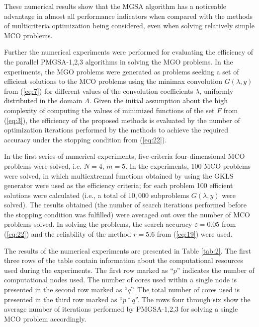\documentclass[review]{elsarticle}
\begin{document}
These numerical results show that the MGSA algorithm has a noticeable advantage in almost all performance indicators when compared with the methods of multicriteria optimization being considered, even when solving relatively simple MCO problems.

Further the numerical experiments were performed for evaluating the efficiency of the parallel PMGSA-1,2,3 algorithms in solving the MGO problems. In the experiments, the MGO problems were generated as problems seeking a set of efficient solutions to the MCO problems using the minimax convolution $G (\lambda, y)$ from (\ref{eq:7}) for different values of the convolution coefficients $\lambda$, uniformly distributed in the domain $\Lambda$. Given the initial assumption about the high complexity of computing the values of minimized functions of the set $F$ from (\ref{eq:3}), the efficiency of the proposed methods is evaluated by the number of optimization iterations performed by the methods to achieve the required accuracy under the stopping condition from (\ref{eq:22}).

In the first series of numerical experiments, five-criteria four-dimensional MCO problems were solved, i.e. $N = 4$, $m = 5$. In the experiments, 100 MCO problems were solved, in which multiextremal functions obtained by using the GKLS generator \cite{c39} were used as the efficiency criteria; for each problem 100 efficient solutions were calculated (i.e., a total of $10,000$ subproblems $G (\lambda, y)$ were solved). The results obtained (the number of search iterations performed before the stopping condition was fulfilled) were averaged out over the number of MCO problems solved. In solving the problems, the search accuracy $\varepsilon = 0.05$ from (\ref{eq:22}) and the reliability of the method $r = 5.6$ from (\ref{eq:19}) were used.
 
The results of the numerical experiments are presented in Table \ref{tab:2}. The first three rows of the table contain information about the computational resources used during the experiments. The first row marked as ``$p$'' indicates the number of computational nodes used. The number of cores used within a single node is presented in the second row marked as ``$q$''. The total number of cores used is presented in the third row marked as ``$p*q$''. The rows four through six show the average number of iterations performed by PMGSA-1,2,3 for solving a single MCO problem accordingly.
\end{document}
